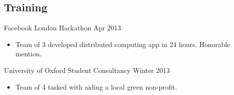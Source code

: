 \documentclass[margin]{res}
\newcommand{\nbdatesubsection}[2]{#1 \hfill #2 }
\newcommand{\datesubsection}[2]{\textbf{#1} \hfill #2 }
\begin{document}
\begin{sloppypar}
\begin{resume}



\section{Training}


\nbdatesubsection{Facebook London Hackathon}{Apr 2013}
    \begin{itemize}
        \item Team of 3 developed distributed computing app in 24 hours. Honorable mention.
    \end{itemize}

\nbdatesubsection{University of Oxford Student Consultancy}{Winter 2013}
    \begin{itemize}
            \item Team of 4 tasked with aiding a local green non-profit.
    \end{itemize}


\end{resume}
\end{sloppypar}
\end{document}
